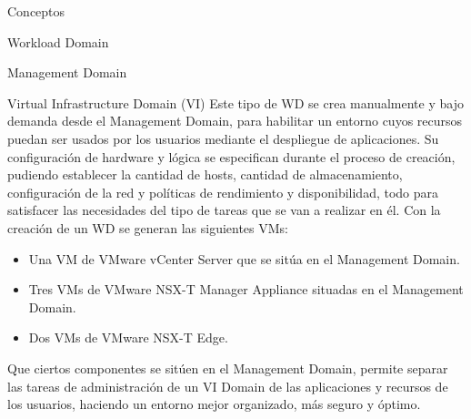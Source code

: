\begin{section}{Conceptos}
\begin{subsection}{Workload Domain}
\begin{subsubsection}{Management Domain}

\end{subsubsection}

\begin{subsubsection}{Virtual Infrastructure Domain (VI)}
\label{subsubsec:domainVI}
Este tipo de WD se crea manualmente y bajo demanda desde el Management Domain, para habilitar un entorno cuyos recursos puedan ser usados por los usuarios mediante el despliegue de aplicaciones. Su configuración de hardware y lógica se especifican durante el proceso de creación, pudiendo establecer la cantidad de hosts, cantidad de almacenamiento, configuración de la red y políticas de rendimiento y disponibilidad, todo para satisfacer las necesidades del tipo de tareas que se van a realizar en él. Con la creación de un WD se generan las siguientes VMs:
\begin{itemize}
  \item Una VM de VMware vCenter Server que se sitúa en el Management Domain.
  \item Tres VMs de VMware NSX-T Manager Appliance situadas en el Management Domain.
  \item Dos VMs de VMware NSX-T Edge.
\end{itemize}
Que ciertos componentes se sitúen en el Management Domain, permite separar las tareas de administración de un VI Domain de las aplicaciones y recursos de los usuarios, haciendo un entorno mejor organizado, más seguro y óptimo.


\end{subsubsection}
\end{subsection}
\end{section}
